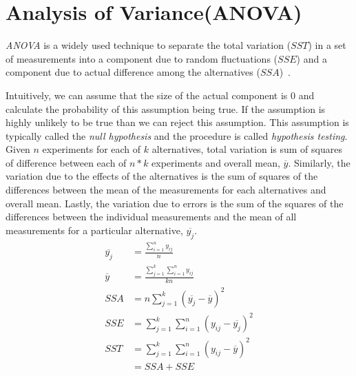 \section{Analysis of Variance(ANOVA)}

\emph{ANOVA} is a widely used technique to separate the total
variation ($\mathit{SST}$) in a set of measurements into a component
due to random fluctuations ($\mathit{SSE}$) and a component due to
actual difference among the alternatives
($\mathit{SSA}$)~\cite{lilja:2005}.

Intuitively, we can assume that the size of the actual component is
$0$ and calculate the probability of this assumption being true.
If the assumption is highly unlikely to be true than we can reject
this assumption. This assumption is typically called the \emph{null
  hypothesis} and the procedure is called \emph{hypothesis testing}.
Given $n$ experiments for each of $k$ alternatives, total variation is
sum of squares of difference between each of $n*k$ experiments and
overall mean, $\overline{y}$. Similarly, the variation due to the
effects of the alternatives is the sum of squares of the differences
between the mean of the measurements for each alternatives and overall
mean. Lastly, the variation due to errors is the sum of the squares
of the differences between the individual measurements and the mean of
all measurements for a particular alternative, $\overline{y_j}$.
\begin{align}
\overline{y_j}&=\frac{\sum_{i=1}^ny_{ij}}{n}\\
\overline{y}&=\frac{\sum_{j=1}^k\sum_{i=1}^ny_{ij}}{kn}\\
\mathit{SSA}&=n\sum\limits_{j=1}^k(\overline{y_j}-\overline{y})^2\\
\mathit{SSE}&=\sum\limits_{j=1}^k\sum\limits_{i=1}^n(y_{ij}-\overline{y_j})^2\\
\mathit{SST}&=\sum\limits_{j=1}^k\sum\limits_{i=1}^n(y_{ij}-\overline{y})^2\\
           &=\mathit{SSA}+\mathit{SSE}
\end{align}

